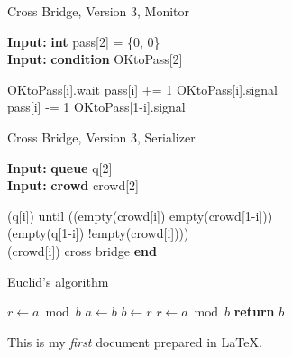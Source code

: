 \documentclass{article}
\renewcommand{\algorithmicrequire}{\textbf{Input: }}
\begin{document}
\begin{algorithm}
  \caption{Cross Bridge, Version 3, Monitor}
  \algorithmicrequire \textbf{int} pass[2] = \{0, 0\} \\
  \algorithmicrequire \textbf{condition} OKtoPass[2] \\

  \begin{algorithmic}
        \State OKtoPass[i].wait
      \EndIf
      \State pass[i] += 1
        \State OKtoPass[i].signal
      \EndIf
    \EndProcedure
    \\
      \State pass[i] -= 1
        \State OKtoPass[1-i].signal
      \EndIf
    \EndProcedure
  \end{algorithmic}
\end{algorithm}


\begin{algorithm}
  \caption{Cross Bridge, Version 3, Serializer}
  \algorithmicrequire \textbf{queue} q[2] \\
  \algorithmicrequire \textbf{crowd} crowd[2] \\

  \begin{algorithmic}
      \State \enqueue(q[i]) until ((empty(crowd[i]) \And empty(crowd[1-i])) \\
      \State \textit{           } \Or (empty(q[1-i]) \And !empty(crowd[i]))) \\
      \State \joincrowd(crowd[i])
        \State \textit{          }cross bridge
      \State \textbf{end}
    \EndProcedure
  \end{algorithmic}
\end{algorithm}



\begin{algorithm}
\caption{Euclid’s algorithm}\label{euclid}
\begin{algorithmic}[1]
\State $r\gets a\bmod b$
\State $a\gets b$
\State $b\gets r$
\State $r\gets a\bmod b$
\EndWhile\label{euclidendwhile}
\State \textbf{return} $b$
\EndProcedure
\end{algorithmic}
\end{algorithm}



This is my \emph{first} document prepared in \LaTeX.
\end{document}
